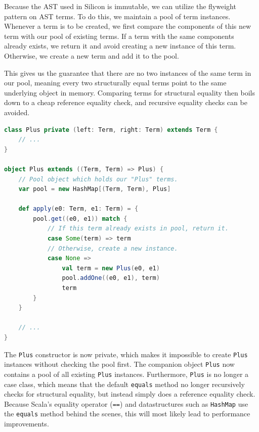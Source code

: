 \documentclass[11pt]{article}
\begin{document}
    Because the AST used in Silicon is immutable, we can utilize the flyweight pattern \cite{patterns} on AST terms.
    To do this, we maintain a pool of term instances. Whenever a term
    is to be created, we first compare the components of this new term with our
    pool of existing terms. If a term with the same components already exists, we return it and
    avoid creating a new instance of this term. Otherwise, we create a new term and add it to
    the pool.

    This gives us the guarantee that there are no two instances of the
    same term in our pool, meaning every two structurally equal terms point to the same
    underlying object in memory. Comparing terms for structural equality then boils
    down to a cheap reference equality check, and recursive equality checks can be avoided.
    
    \begin{lstlisting}[language=Scala, caption=Avoid instantiating multiple structurally equal terms using the flyweight pattern.]
class Plus private (left: Term, right: Term) extends Term {
    // ...
}

object Plus extends ((Term, Term) => Plus) {
    // Pool object which holds our "Plus" terms.
    var pool = new HashMap[(Term, Term), Plus]

    def apply(e0: Term, e1: Term) = {
        pool.get((e0, e1)) match {
            // If this term already exists in pool, return it. 
            case Some(term) => term
            // Otherwise, create a new instance.
            case None =>
                val term = new Plus(e0, e1)
                pool.addOne((e0, e1), term)
                term
        }
    }

    // ...
}
    \end{lstlisting}

    The \texttt{Plus} constructor is now private, which makes it impossible to
    create \texttt{Plus} instances without checking the pool first. The companion
    object \texttt{Plus} now contains a pool of all existing \texttt{Plus} instances. Furthermore,
    \texttt{Plus} is no longer a case class, which means that the default \texttt{equals}
    method no longer recursively checks for structural equality, but instead
    simply does a reference equality check. Because Scala's equality operator (\texttt{==})
    and datastructures such as \texttt{HashMap} use the \texttt{equals} method behind
    the scenes, this will most likely lead to performance improvements.
\end{document}
